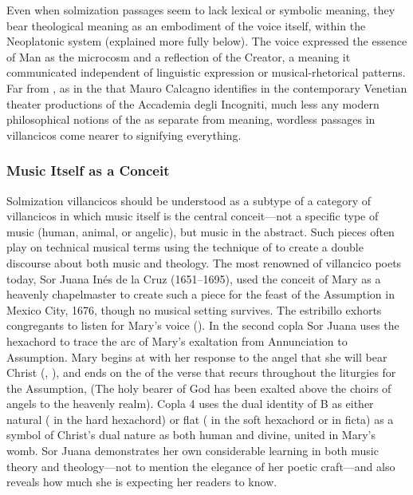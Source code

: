 Even when solmization passages seem to lack lexical or symbolic meaning, they
bear theological meaning as an embodiment of the voice itself, within the
Neoplatonic system (explained more fully below).
The voice expressed the essence of Man as the microcosm and a reflection of the
Creator, a meaning it communicated independent of linguistic expression or
musical-rhetorical patterns.
Far from , as in the  that Mauro Calcagno identifies in the contemporary Venetian theater
productions of the Accademia degli Incogniti, much less any modern
philosophical notions of the  as separate from meaning,
wordless passages in villancicos come nearer to signifying everything.%
    \Autocites
    {Calcagno:SignifyingNothing}
    {Feldman:Voice}
    {Barthes:GrainOfVoice}
    {Dolar:Voice}
    {Cavarero:Voice}

\subsubsection{Music Itself as a Conceit}

Solmization villancicos should be understood as a subtype of a category of
villancicos in which music itself is the central conceit---not a specific type
of music (human, animal, or angelic), but music in the abstract.
Such pieces often play on technical musical terms using the technique of
 to create a double discourse about both music and theology.
The most renowned of villancico poets today, Sor Juana Inés de la Cruz
(1651--1695), used the conceit of Mary as a heavenly chapelmaster to create
such a piece for the feast of the Assumption in Mexico City, 1676, though no
musical setting survives.%
    \Autocite[, ]{SorJuana:VC} 
The estribillo exhorts congregants to listen for Mary's voice
().
In the second copla Sor Juana uses the hexachord to trace the arc of Mary's
exaltation from Annunciation to Assumption. 
Mary begins at  with her response to the angel that she will bear
Christ (, ), and ends on the
 of the verse that recurs throughout the liturgies for the Assumption,
 (The holy bearer of God has been exalted above the choirs of angels to
the heavenly realm).
Copla 4 uses the dual identity of B as either natural ( in the hard
hexachord) or flat ( in the soft hexachord or in ficta) as a symbol of
Christ's dual nature as both human and divine, united in Mary's womb.
Sor Juana demonstrates her own considerable learning in both music theory and
theology---not to mention the elegance of her poetic craft---and also reveals
how much she is expecting her readers to know.%
    \Autocites
    {Tenorio:SorJuana}
    {Stevenson:SorJuanaMusicalRapports}

